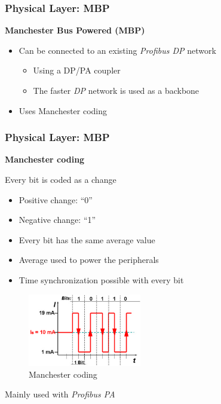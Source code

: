 \documentclass{beamer}
\begin{document}
\begin{frame}
  \frametitle{Physical Layer: MBP}
  \textbf{Manchester Bus Powered (MBP)}
  \begin{itemize}
    \item Can be connected to an existing \textit{Profibus DP} network
      \begin{itemize}
        \item Using a DP/PA coupler
        \item The faster \textit{DP} network is used as a backbone
      \end{itemize}
    \item Uses Manchester coding
  \end{itemize}
\end{frame}

\begin{frame}
  \frametitle{Physical Layer: MBP}
  \textbf{Manchester coding} \\
  \begin{itemize}
    \begin{multicols}{2}
    \item Every bit is coded as a change
      \begin{itemize}
        \item Positive change: ``0''
        \item Negative change: ``1''
        \item Every bit has the same average value
        \item Average used to power the peripherals
        \item Time synchronization possible with every bit
      \end{itemize}
      \columnbreak
      \begin{figure}[h]
        \centering
        \includegraphics[width=140pt]{img/mbp}
        \caption{Manchester coding}
        \label{fig:mbp}
      \end{figure}
    \end{multicols}
  \end{itemize}
  Mainly used with \textit{Profibus PA}
\end{frame}
\end{document}
